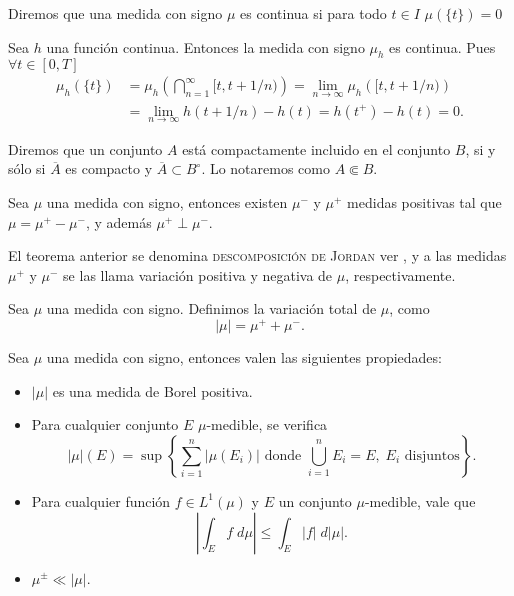 \begin{defi}
	Diremos que una medida con signo $\mu$ es continua  si para todo $t\in I$ $\mu(\{t\})=0$
\end{defi}
\begin{obs}\label{obs:medida continua}
	Sea $h$ una  función continua. Entonces la medida con signo $\mu_{h}$ es continua. Pues $\forall t\in[0,T]$
 \begin{equation*}
	\begin{split}
		\mu_{h}(\{t\})&= \mu_{h}\left( \bigcap_{n=1}^{\infty}[t,t+1/n)\right)=\lim_{n\to \infty}\mu_{h}\left( [t,t+1/n)\right)\\&=\lim_{n\to \infty}h(t+1/n)-h(t)=h(t^+)-h(t)=0.
	\end{split}
 \end{equation*}
\end{obs}

\begin{defi}
	Diremos que un conjunto $A$ está compactamente incluido  en el conjunto $B$, si y sólo si $\overline{A}$ es compacto y $\overline{A}\subset B^\circ$. Lo notaremos como $A\Subset B$.
	\index[Simbolo]{$\Subset$}
 \end{defi}
\begin{thm}
    Sea $\mu$ una medida con signo, entonces existen $\mu^-$ y $\mu^+$ medidas positivas tal que $\mu=\mu^+-\mu^-$, y además $\mu^+\perp \mu^-$.\index[Simbolo]{$\mu^+$}\index[Simbolo]{$\mu^-$}
\end{thm}
El teorema anterior se denomina \textsc{descomposición de Jordan} ver \cite[Capitulo 3.1]{folland}, y a las medidas $\mu^+$ y $\mu^-$ se las llama variación positiva y negativa de $\mu$, respectivamente.

\begin{defi}
    Sea $\mu$ una medida con signo. Definimos la variación total de $\mu$, como 
    \begin{equation*}
        |\mu|=\mu^+ +\mu^-.
    \end{equation*}\index[Simbolo]{$\vert\mu\vert$}
\end{defi}


\begin{obs}
 Sea $\mu$ una medida con signo, entonces valen las siguientes propiedades: \label{obs:medida}
 \begin{itemize}
 \item $|\mu|$ es una medida de Borel positiva.
     \item Para cualquier conjunto $E$ $\mu$-medible,  se verifica
 \begin{equation}
     |\mu|(E)=\sup\left\{\sum_{i=1}^n|\mu(E_i)| \text{ donde }\bigcup_{i=1}^nE_i=E, \; E_i \text{ disjuntos}  \right\}.
 \end{equation}

 \item Para cualquier función $f\in L^1(\mu)$ y $E$ un conjunto $\mu$-medible, vale que
 $$\left|\int_Ef\;d\mu\right|\leq \int_E|f|\; d|\mu|.$$
 \item $ \mu^{\pm}\ll |\mu|$.
 \end{itemize}
\end{obs}

